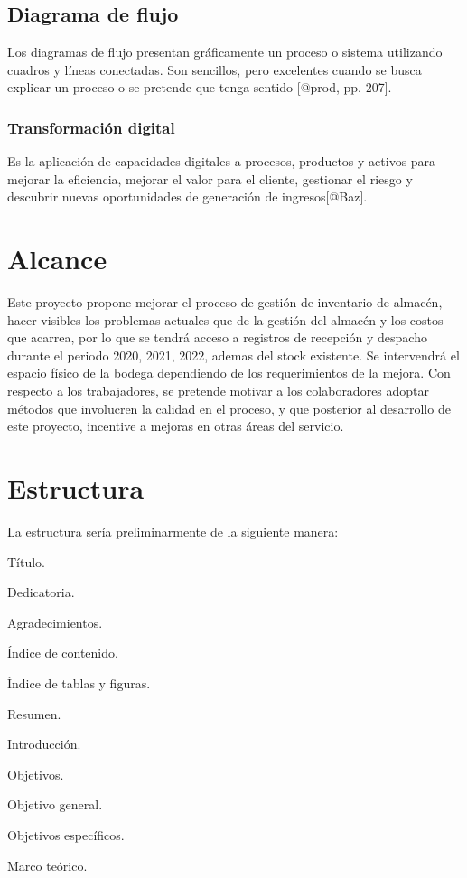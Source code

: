 \documentclass[a4papper,11pt]{article}
\begin{document}
  \subsection{Diagrama de flujo}
    Los diagramas de flujo presentan gráficamente un proceso o sistema utilizando cuadros y líneas conectadas. Son sencillos, pero excelentes cuando se busca explicar un proceso o se pretende que tenga sentido [@prod, pp. 207].
  \subsubsection{Transformación digital}
    Es la aplicación de capacidades digitales a procesos, productos y activos para mejorar la eficiencia, mejorar el valor para el cliente, gestionar el riesgo y descubrir nuevas oportunidades de generación de ingresos[@Baz].
  \section{Alcance}
    Este proyecto propone mejorar el proceso de gestión de inventario de almacén, hacer visibles los problemas actuales que de la gestión del almacén y los costos que acarrea, por lo que se tendrá acceso a registros de recepción y despacho durante el periodo 2020, 2021, 2022, ademas del stock existente. Se intervendrá el espacio físico de la bodega dependiendo de los requerimientos de la mejora.
    Con respecto a los trabajadores, se pretende motivar a los colaboradores adoptar métodos que involucren la calidad en el proceso, y que posterior al desarrollo de este proyecto, incentive a mejoras en otras áreas del servicio.
  \section{Estructura}
    La estructura sería preliminarmente de la siguiente manera:
    
    Título.

    Dedicatoria.

    Agradecimientos.

    Índice de contenido.

    Índice de tablas y figuras.

    Resumen.

    Introducción.

    Objetivos.

    Objetivo general.

    Objetivos específicos.

    Marco teórico.
\end{document}
